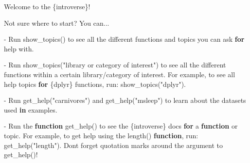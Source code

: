 \documentclass[
  10pt,
  italian,
  a4paper,
  extrafontsizes,onecolumn,openright
  ]{memoir}
\makeatletter
\newenvironment{Shaded}{\begin{snugshade}}{\end{snugshade}}
\newcommand{\AttributeTok}[1]{\textcolor[rgb]{0.77,0.63,0.00}{#1}}
\newcommand{\ControlFlowTok}[1]{\textcolor[rgb]{0.13,0.29,0.53}{\textbf{#1}}}
\newcommand{\FunctionTok}[1]{\textcolor[rgb]{0.00,0.00,0.00}{#1}}
\newcommand{\NormalTok}[1]{#1}
\newcommand{\SpecialCharTok}[1]{\textcolor[rgb]{0.00,0.00,0.00}{#1}}
\newcommand{\StringTok}[1]{\textcolor[rgb]{0.31,0.60,0.02}{#1}}
\newcommand{\MemoirChapStyle}{daleif1}
\newcommand{\MemoirPageStyle}{Ruled}
\newlength\widthw %
\newcommand*{\SmallMargins}{
  \setlrmarginsandblock{1.5in}{1.5in}{*}
  \setmarginnotes{0.1in}{0.1in}{0.1in}
 \setulmarginsandblock{1.5in}{1in}{*}
  \checkandfixthelayout
  \ch@ngetext
  \clearpage
  \setlength{\widthw}{\textwidth+\marginparsep+\marginparwidth}
  \footnotesatfoot
  \chapterstyle{\MemoirChapStyle}  %
  \pagestyle{\MemoirPageStyle}
}
\newcommand{\LargeMargins}{\SmallMargins}
\makeatother
\begin{document}
\begin{Shaded}
\begin{Highlighting}[]
\NormalTok{Welcome to the \{introverse\}}\SpecialCharTok{!}

\NormalTok{Not sure where to start? You can...}

\SpecialCharTok{{-}}\NormalTok{ Run }\FunctionTok{show\_topics}\NormalTok{() to see all the different functions }
\NormalTok{  and topics you can ask }\ControlFlowTok{for}\NormalTok{ help with.}
  
\SpecialCharTok{{-}}\NormalTok{ Run }\FunctionTok{show\_topics}\NormalTok{(}\StringTok{"library or category of interest"}\NormalTok{) to see }
\NormalTok{  all the different functions within a certain library}\SpecialCharTok{/}\NormalTok{category }
\NormalTok{  of interest. For example, to see all help topics }\ControlFlowTok{for}\NormalTok{ \{dplyr\}}
\NormalTok{  functions, run}\SpecialCharTok{:} \FunctionTok{show\_topics}\NormalTok{(}\StringTok{"dplyr"}\NormalTok{).}

\SpecialCharTok{{-}}\NormalTok{ Run }\FunctionTok{get\_help}\NormalTok{(}\StringTok{"carnivores"}\NormalTok{) and }\FunctionTok{get\_help}\NormalTok{(}\StringTok{"msleep"}\NormalTok{) to learn }
\NormalTok{  about the datasets used }\ControlFlowTok{in}\NormalTok{ examples.}
    
\SpecialCharTok{{-}}\NormalTok{ Run the }\ControlFlowTok{function} \FunctionTok{get\_help}\NormalTok{() to see the \{introverse\} docs}
  \ControlFlowTok{for}\NormalTok{ a }\ControlFlowTok{function}\NormalTok{ or topic. For example, to get help using }
\NormalTok{  the }\StringTok{\textasciigrave{}}\AttributeTok{length()}\StringTok{\textasciigrave{}} \ControlFlowTok{function}\NormalTok{, run}\SpecialCharTok{:} \FunctionTok{get\_help}\NormalTok{(}\StringTok{"length"}\NormalTok{).}
\NormalTok{  Don}\StringTok{\textquotesingle{}t forget quotation marks around the argument to get\_help()!}
\end{Highlighting}
\end{Shaded}




\backmatter
\SmallMargins

\printbibliography
\onecolumn




\cleardoublepage
\LargeMargins
\listoffigures
\end{document}
